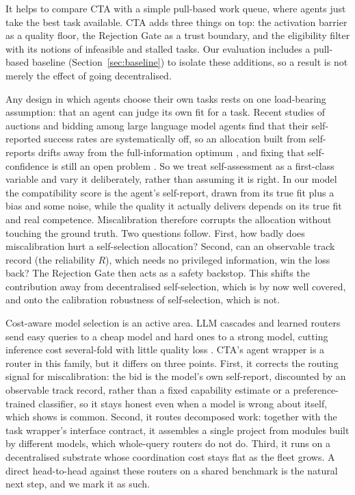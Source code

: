 \documentclass[11pt]{article}
\begin{document}
It helps to compare CTA with a simple pull-based work queue, where agents just take the best task available. CTA adds three things on top: the activation barrier as a quality floor, the Rejection Gate as a trust boundary, and the eligibility filter with its notions of infeasible and stalled tasks. Our evaluation includes a pull-based baseline (Section~\ref{sec:baseline}) to isolate these additions, so a result is not merely the effect of going decentralised.

Any design in which agents choose their own tasks rests on one load-bearing assumption: that an agent can judge its own fit for a task. Recent studies of auctions and bidding among large language model agents find that their self-reported success rates are systematically off, so an allocation built from self-reports drifts away from the full-information optimum \citep{fradkin2026marketbench}, and fixing that self-confidence is still an open problem \citep{zhang2026confidence}. So we treat self-assessment as a first-class variable and vary it deliberately, rather than assuming it is right. In our model the compatibility score is the agent's self-report, drawn from its true fit plus a bias and some noise, while the quality it actually delivers depends on its true fit and real competence. Miscalibration therefore corrupts the allocation without touching the ground truth. Two questions follow. First, how badly does miscalibration hurt a self-selection allocation? Second, can an observable track record (the reliability $R$), which needs no privileged information, win the loss back? The Rejection Gate then acts as a safety backstop. This shifts the contribution away from decentralised self-selection, which is by now well covered, and onto the calibration robustness of self-selection, which is not.

Cost-aware model selection is an active area. LLM cascades and learned routers send easy queries to a cheap model and hard ones to a strong model, cutting inference cost several-fold with little quality loss \citep{chen2023frugalgpt,ong2024routellm}. CTA's agent wrapper is a router in this family, but it differs on three points. First, it corrects the routing signal for miscalibration: the bid is the model's own self-report, discounted by an observable track record, rather than a fixed capability estimate or a preference-trained classifier, so it stays honest even when a model is wrong about itself, which \citet{fradkin2026marketbench} shows is common. Second, it routes decomposed work: together with the task wrapper's interface contract, it assembles a single project from modules built by different models, which whole-query routers do not do. Third, it runs on a decentralised substrate whose coordination cost stays flat as the fleet grows. A direct head-to-head against these routers on a shared benchmark is the natural next step, and we mark it as such.
\end{document}
